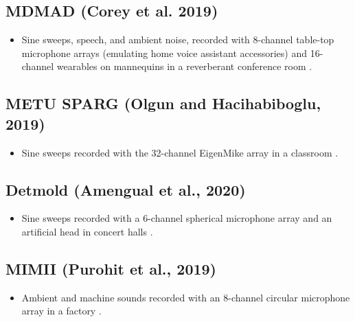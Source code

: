 \documentclass[14pt, legalpaper]{extarticle}
\begin{document}
\subsection{MDMAD (Corey et al. 2019)}

\begin{itemize}

\item Sine sweeps, speech, and ambient noise, recorded with 8-channel table-top microphone arrays (emulating home voice assistant accessories) and 16-channel wearables on mannequins in a reverberant conference room \cite{corey2019massive}.

\end{itemize}

\subsection{METU SPARG (Olgun and Hacihabiboglu, 2019)}

\begin{itemize}

\item Sine sweeps recorded with the 32-channel EigenMike array in a classroom \cite{olgun2019metu}.

\end{itemize}

\subsection{Detmold (Amengual et al., 2020)}

\begin{itemize}

\item Sine sweeps recorded with a 6-channel spherical microphone array and an artificial head in concert halls \cite{amengual2020open}.

\end{itemize}

\subsection{MIMII (Purohit et al., 2019)}

\begin{itemize}

\item Ambient and machine sounds recorded with an 8-channel circular microphone array in a factory \cite{purohit2019mimii}.

\end{itemize}
\end{document}
